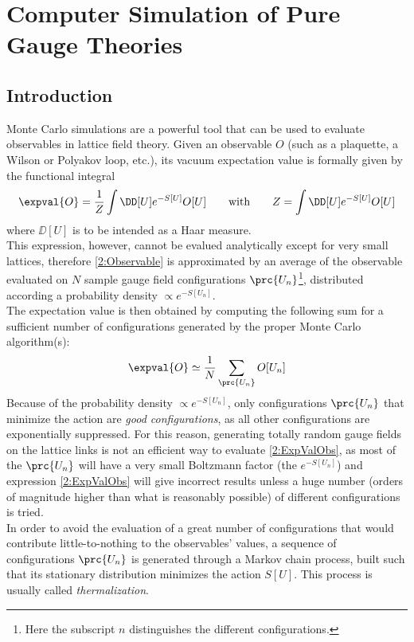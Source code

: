\pagestyle{myFancy}
\chapter{Computer Simulation of Pure Gauge Theories}
\section{Introduction}
Monte Carlo simulations are a powerful tool that can be used to evaluate observables in lattice field theory.
Given an observable $O$ (such as a plaquette, a Wilson or Polyakov loop, etc.), its vacuum expectation value is formally given by the functional integral
\begin{equation}
    \expval{O} = \frac1Z\int\DD[U]e^{-S[U]}O[U] \qquad \text{with} \qquad Z = \int\DD[U]e^{-S[U]}O[U] \label{2:Observable}
\end{equation}
where $\DD[U]$ is to be intended as a Haar measure.\\
This expression, however, cannot be evalued analytically except for very small lattices, therefore \eqref{2:Observable} is approximated by an average of the observable evaluated on $N$ sample gauge field configurations $\prc{U_n}$\footnote{Here the subscript $n$ distinguishes the different configurations.}, distributed according a probability density $\varpropto e^{-S[U_n]}$.\\
The expectation value is then obtained by computing the following sum for a sufficient number of configurations generated by the proper Monte Carlo algorithm(s):
\begin{equation}
    \expval{O} \simeq \frac1N\sum_{\prc{U_n}}O[U_n] \label{2:ExpValObs}
\end{equation}
Because of the probability density $\varpropto e^{-S[U_n]}$, only configurations $\prc{U_n}$ that minimize the action are \emph{good configurations}, as all other configurations are exponentially suppressed.
For this reason, generating totally random gauge fields on the lattice links is not an efficient way to evaluate \eqref{2:ExpValObs}, as most of the $\prc{U_n}$ will have a very small Boltzmann factor (the $e^{-S[U_n]}$) and expression \eqref{2:ExpValObs} will give incorrect results unless a huge number (orders of magnitude higher than what is reasonably possible) of different configurations is tried.\\
In order to avoid the evaluation of a great number of configurations that would contribute little-to-nothing to the observables' values, a sequence of configurations $\prc{U_n}$ is generated through a Markov chain process, built such that its stationary distribution minimizes the action $S[U]$. This process is usually called \emph{thermalization}.\\
